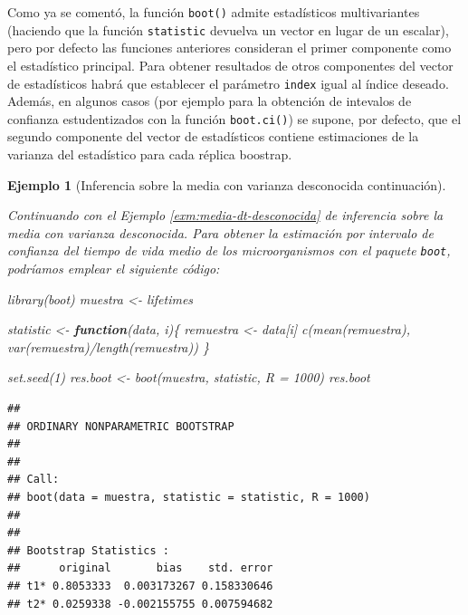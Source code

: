 \documentclass[
]{book}
\newenvironment{Shaded}{\begin{snugshade}}{\end{snugshade}}
\newcommand{\AttributeTok}[1]{\textcolor[rgb]{0.77,0.63,0.00}{#1}}
\newcommand{\ControlFlowTok}[1]{\textcolor[rgb]{0.13,0.29,0.53}{\textbf{#1}}}
\newcommand{\DecValTok}[1]{\textcolor[rgb]{0.00,0.00,0.81}{#1}}
\newcommand{\FunctionTok}[1]{\textcolor[rgb]{0.00,0.00,0.00}{#1}}
\newcommand{\NormalTok}[1]{#1}
\newcommand{\OtherTok}[1]{\textcolor[rgb]{0.56,0.35,0.01}{#1}}
\newcommand{\SpecialCharTok}[1]{\textcolor[rgb]{0.00,0.00,0.00}{#1}}
\theoremstyle{break}
\newtheorem{example}{Ejemplo}[chapter]
\theoremstyle{nonumberplain}
\begin{document}
Como ya se comentó, la función \texttt{boot()} admite estadísticos multivariantes
(haciendo que la función \texttt{statistic} devuelva un vector en lugar de un escalar),
pero por defecto las funciones anteriores consideran el primer componente
como el estadístico principal.
Para obtener resultados de otros componentes del vector de estadísticos
habrá que establecer el parámetro \texttt{index} igual al índice deseado.
Además, en algunos casos (por ejemplo para la obtención de intevalos de confianza
estudentizados con la función \texttt{boot.ci()}) se supone, por defecto, que el segundo
componente del vector de estadísticos contiene estimaciones de la varianza del
estadístico para cada réplica boostrap.

\begin{example}[Inferencia sobre la media con varianza desconocida continuación]
\protect\hypertarget{exm:media-dt-desconocida-boot}{}\label{exm:media-dt-desconocida-boot}

Continuando con el Ejemplo \ref{exm:media-dt-desconocida} de
inferencia sobre la media con varianza desconocida.
Para obtener la estimación por intervalo de confianza del tiempo de vida medio
de los microorganismos con el paquete \texttt{boot}, podríamos emplear
el siguiente código:

\begin{Shaded}
\begin{Highlighting}[]
\FunctionTok{library}\NormalTok{(boot)}
\NormalTok{muestra }\OtherTok{\textless{}{-}}\NormalTok{ lifetimes}

\NormalTok{statistic }\OtherTok{\textless{}{-}} \ControlFlowTok{function}\NormalTok{(data, i)\{}
\NormalTok{  remuestra }\OtherTok{\textless{}{-}}\NormalTok{ data[i]}
  \FunctionTok{c}\NormalTok{(}\FunctionTok{mean}\NormalTok{(remuestra), }\FunctionTok{var}\NormalTok{(remuestra)}\SpecialCharTok{/}\FunctionTok{length}\NormalTok{(remuestra))}
\NormalTok{\}}

\FunctionTok{set.seed}\NormalTok{(}\DecValTok{1}\NormalTok{)}
\NormalTok{res.boot }\OtherTok{\textless{}{-}} \FunctionTok{boot}\NormalTok{(muestra, statistic, }\AttributeTok{R =} \DecValTok{1000}\NormalTok{)}
\NormalTok{res.boot}
\end{Highlighting}
\end{Shaded}

\begin{verbatim}
## 
## ORDINARY NONPARAMETRIC BOOTSTRAP
## 
## 
## Call:
## boot(data = muestra, statistic = statistic, R = 1000)
## 
## 
## Bootstrap Statistics :
##      original       bias    std. error
## t1* 0.8053333  0.003173267 0.158330646
## t2* 0.0259338 -0.002155755 0.007594682
\end{verbatim}


\end{example}
\end{document}
